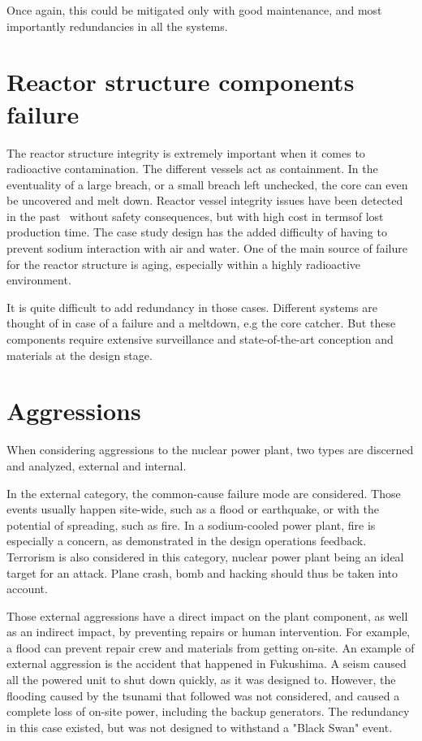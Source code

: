 Once again, this could be mitigated only with good maintenance, and most importantly redundancies in all the systems.



\section{Reactor structure components failure}
\label{sec3:structure_failures}

The reactor structure integrity is extremely important when it comes to radioactive contamination. The different vessels act as containment. In the eventuality of a large breach, or a small breach left unchecked, the core can even be uncovered and melt down. Reactor vessel integrity issues have been detected in the past~\cite{nrc200201} without safety consequences, but with high cost in termsof lost production time. The case study design has the added difficulty of having to prevent sodium interaction with air and water. One of the main source of failure for the reactor structure is aging, especially within a highly radioactive environment. 

It is quite difficult to add redundancy in those cases. Different systems are thought of in case of a failure and a meltdown, e.g the core catcher. But these components require extensive surveillance and state-of-the-art conception and materials at the design stage.


\section{Aggressions}
\label{sec4:aggressions}

When considering aggressions to the nuclear power plant, two types are discerned and analyzed, external and internal.

In the external category, the common-cause failure mode are considered. Those events usually happen site-wide, such as a flood or earthquake, or with the potential of spreading, such as fire. In a sodium-cooled power plant, fire is especially a concern, as demonstrated in the design operations feedback. Terrorism is also considered in this category, nuclear power plant being an ideal target for an attack. Plane crash, bomb and hacking should thus be taken into account.

Those external aggressions have a direct impact on the plant component, as well as an indirect impact, by preventing repairs or human intervention. For example, a flood can prevent repair crew and materials from getting on-site. An example of external aggression is the accident that happened in Fukushima. A seism caused all the powered unit to shut down quickly, as it was designed to. However, the flooding caused by the tsunami that followed was not considered, and caused a complete loss of on-site power, including the backup generators. The redundancy in this case existed, but was not designed to withstand a "Black Swan" event.


